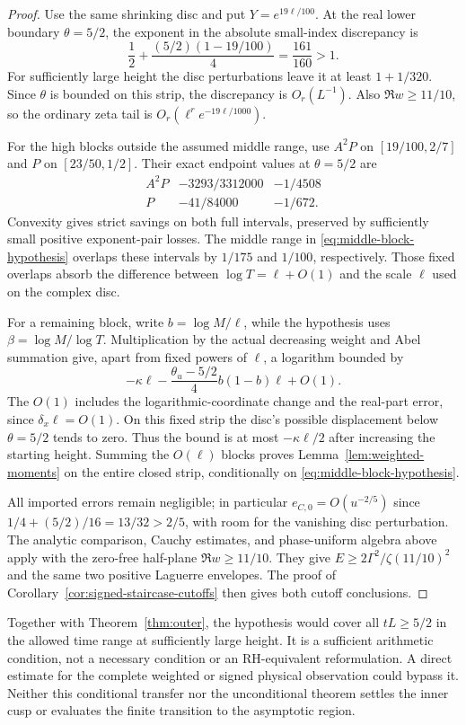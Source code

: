 \documentclass[11pt]{article}
\numberwithin{equation}{section}
\theoremstyle{definition}
\theoremstyle{remark}
\begin{document}
\begin{proof}
Use the same shrinking disc and put $Y=e^{19\ell/100}$. At the real
lower boundary $\theta=5/2$, the exponent in the absolute small-index
discrepancy is
\[
 \frac12+\frac{(5/2)(1-19/100)}4=\frac{161}{160}>1.
\]
For sufficiently large height the disc perturbations leave it at least
$1+1/320$. Since $\theta$ is bounded on this strip, the discrepancy is
$O_r(L^{-1})$. Also $\Re w\ge11/10$, so the ordinary zeta tail is
$O_r(\ell^r e^{-19\ell/1000})$.

For the high blocks outside the assumed middle range, use $A^2P$ on
$[19/100,2/7]$ and $P$ on $[23/50,1/2]$. Their exact endpoint
values at $\theta=5/2$ are
\[
 \begin{array}{c|cc}
 A^2P&-3293/3312000&-1/4508\\
 P&-41/84000&-1/672.
 \end{array}
\]
Convexity gives strict savings on both full intervals, preserved by
sufficiently small positive exponent-pair losses. The middle range in
\eqref{eq:middle-block-hypothesis} overlaps these intervals by $1/175$
and $1/100$, respectively. Those fixed overlaps absorb the difference
between $\log T=\ell+O(1)$ and the scale $\ell$ used on the complex disc.

For a remaining block, write $b=\log M/\ell$, while the hypothesis uses
$\beta=\log M/\log T$. Multiplication by the actual decreasing weight
and Abel summation give, apart from fixed powers of $\ell$, a logarithm
bounded by
\[
 -\kappa\ell-\frac{\theta_u-5/2}{4}b(1-b)\ell+O(1).
\]
The $O(1)$ includes the logarithmic-coordinate change and the real-part
error, since $\delta_x\ell=O(1)$. On this fixed strip the disc's
possible displacement below $\theta=5/2$ tends to zero. Thus the bound
is at most $-\kappa\ell/2$ after increasing the starting height.
Summing the $O(\ell)$ blocks proves Lemma~\ref{lem:weighted-moments}
on the entire closed strip, conditionally on
\eqref{eq:middle-block-hypothesis}.

All imported errors remain negligible; in particular
$e_{C,0}=O(u^{-2/5})$ since $1/4+(5/2)/16=13/32>2/5$, with room
for the vanishing disc perturbation. The analytic comparison, Cauchy
estimates, and phase-uniform algebra above apply with the zero-free
half-plane $\Re w\ge11/10$. They give
$E\ge2\Gamma^2/\zeta(11/10)^2$ and the same two positive Laguerre
envelopes. The proof of Corollary~\ref{cor:signed-staircase-cutoffs}
then gives both cutoff conclusions.
\end{proof}
Together with Theorem~\ref{thm:outer}, the hypothesis would cover all
$tL\ge5/2$ in the allowed time range at sufficiently large height.
It is a sufficient arithmetic condition, not a necessary condition or
an RH-equivalent reformulation. A direct estimate for the complete
weighted or signed physical observation could bypass it. Neither this
conditional transfer nor the unconditional theorem settles the inner
cusp or evaluates the finite transition to the asymptotic region.
\end{document}

